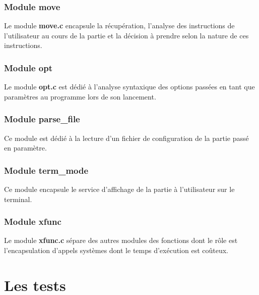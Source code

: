 \documentclass{report}
\begin{document}
\subsection*{Module move}
Le module \textbf{move.c} encapsule la récupération, l'analyse des instructions de l'utilisateur au cours de la partie et la décision à prendre selon la nature de ces instructions.
\subsection*{Module opt}
Le module \textbf{opt.c} est dédié à l'analyse syntaxique des options passées en tant que paramètres au programme lors de son lancement.
\subsection*{Module parse\_file}
Ce module est dédié à la lecture d'un fichier de configuration de la partie passé en paramètre.
\subsection*{Module term\_mode}
Ce module encapsule le service d'affichage de la partie à l'utilisateur sur le terminal.
\subsection*{Module xfunc}
Le module \textbf{xfunc.c} sépare des autres modules des fonctions dont le rôle est l'encapsulation d'appels systèmes dont le temps d'exécution est coûteux.



\chapter{Les tests}
\setcounter{section}{0}
\end{document}
